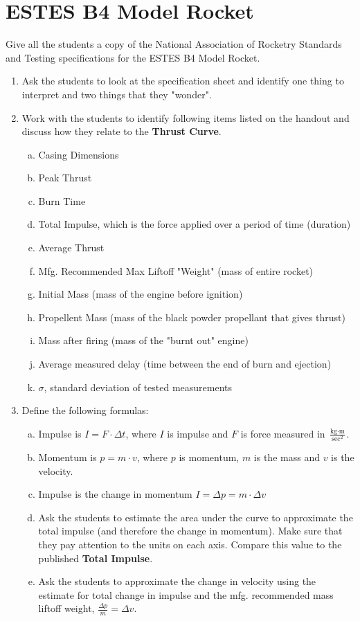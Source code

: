 \documentclass [12pt, letterpaper, titlepage] {article}
\begin{document}
\section*{ESTES B4 Model Rocket}
Give all the students a copy of the National Association of Rocketry Standards and Testing specifications for the ESTES B4 Model Rocket.
\begin{enumerate}
	\item{Ask the students to look at the specification sheet and identify one thing to interpret and two things that they "wonder".}
	\item{Work with the students to identify following items listed on the handout and discuss how they relate to the \textbf{Thrust Curve}.
		\begin{enumerate}[a.]
			\item{Casing Dimensions}
			\item{Peak Thrust}
			\item{Burn Time}
			\item{Total Impulse, which is the force applied over a period of time (duration)}
			\item{Average Thrust}
			\item{Mfg. Recommended Max Liftoff "Weight" (mass of entire rocket)}
			\item{Initial Mass (mass of the engine before ignition)}
			\item{Propellent Mass (mass of the black powder propellant that gives thrust)}
			\item{Mass after firing (mass of the "burnt out" engine)}
			\item{Average measured delay (time between the end of burn and ejection)}	
			\item{$\sigma$, standard deviation of tested measurements}
		\end{enumerate}
	}
	\item{Define the following formulas:
		\begin{enumerate}[a.]
			\item{Impulse is $I = F \cdot \Delta t$, where $I$ is impulse and $F$ is force measured in $\displaystyle \frac{\text{kg} \cdot \text{m}}{\text{sec}^2}$.}
			\item{Momentum is $p = m \cdot v$, where $p$ is momentum, $m$ is the mass and $v$ is the velocity.}
			\item{Impulse is the change in momentum $I = \Delta p = m \cdot \Delta v$}

			\item{Ask the students to estimate the area under the curve to approximate the total impulse (and therefore the change in momentum). Make sure that they pay attention to the units on each axis.  Compare this value to the published \textbf{Total Impulse}. }
			\item{Ask the students to approximate the change in velocity using the estimate for total change in impulse and the mfg. recommended mass liftoff weight, $\displaystyle \frac{\Delta p}{m}=\Delta v$.}
		\end{enumerate}
	}
\end{enumerate}
\newpage
\end{document}

